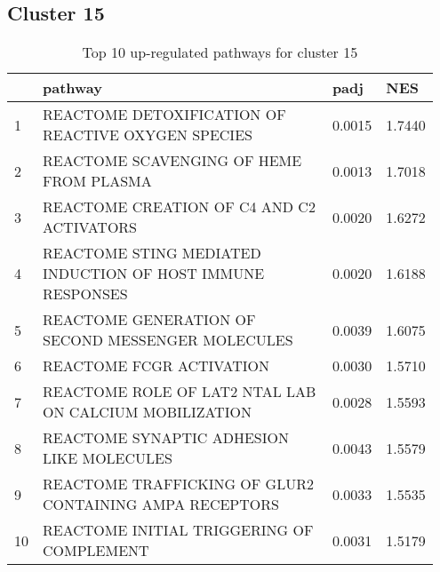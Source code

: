 \documentclass{article}
\begin{document}
\subsection{Cluster 15 }
\begin{table}[H]
\centering
\begin{tabular}{p{0.05\linewidth}p{0.7\linewidth}p{0.1\linewidth}p{0.1\linewidth}}
  \hline
 & pathway & padj & NES \\ 
  \hline
1 & REACTOME DETOXIFICATION OF REACTIVE OXYGEN SPECIES & 0.0015 & 1.7440 \\ 
  2 & REACTOME SCAVENGING OF HEME FROM PLASMA & 0.0013 & 1.7018 \\ 
  3 & REACTOME CREATION OF C4 AND C2 ACTIVATORS & 0.0020 & 1.6272 \\ 
  4 & REACTOME STING MEDIATED INDUCTION OF HOST IMMUNE RESPONSES & 0.0020 & 1.6188 \\ 
  5 & REACTOME GENERATION OF SECOND MESSENGER MOLECULES & 0.0039 & 1.6075 \\ 
  6 & REACTOME FCGR ACTIVATION & 0.0030 & 1.5710 \\ 
  7 & REACTOME ROLE OF LAT2 NTAL LAB ON CALCIUM MOBILIZATION & 0.0028 & 1.5593 \\ 
  8 & REACTOME SYNAPTIC ADHESION LIKE MOLECULES & 0.0043 & 1.5579 \\ 
  9 & REACTOME TRAFFICKING OF GLUR2 CONTAINING AMPA RECEPTORS & 0.0033 & 1.5535 \\ 
  10 & REACTOME INITIAL TRIGGERING OF COMPLEMENT & 0.0031 & 1.5179 \\ 
   \hline
\end{tabular}
\caption{Top 10 up-regulated pathways for cluster 15} 
\label{tab:q3_2_15}
\end{table}
\end{document}
